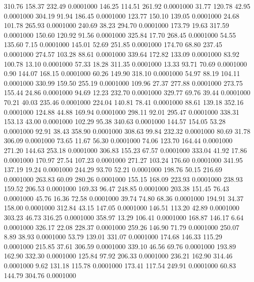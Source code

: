  310.76  158.37  232.49   0.0001000
 146.25  114.51  261.92   0.0001000
  31.77  120.78   42.95   0.0001000
 304.19   91.94  186.45   0.0001000
 123.77  150.10  139.05   0.0001000
  24.68  101.78  265.93   0.0001000
 240.69   38.23  294.70   0.0001000
 173.79   19.63  317.59   0.0001000
 150.60  120.92   91.56   0.0001000
 325.84   17.70  268.45   0.0001000
  54.55  135.60    7.15   0.0001000
 145.01   52.69  251.85   0.0001000
 174.70   68.80  237.45   0.0001000
 274.57  103.28   88.61   0.0001000
 339.64  172.82  133.09   0.0001000
  83.92  100.78   13.10   0.0001000
  57.33   18.28  311.35   0.0001000
  13.33   93.71   70.69   0.0001000
   0.90  144.07  168.15   0.0001000
  60.26  149.90  318.10   0.0001000
  54.97   88.19  104.11   0.0001000
 330.99  159.50  255.19   0.0001000
 109.96   27.37  277.88   0.0001000
 273.75  155.44   24.86   0.0001000
  94.69   12.23  232.70   0.0001000
 329.77   69.76   39.44   0.0001000
  70.21   40.03  235.46   0.0001000
 224.04  140.81   78.41   0.0001000
  88.61  139.18  352.16   0.0001000
 124.88   44.88  169.94   0.0001000
 298.11   92.01  295.47   0.0001000
 338.31  153.13   43.00   0.0001000
 102.29   95.38  340.63   0.0001000
 144.57  154.05   53.28   0.0001000
  92.91   38.43  358.90   0.0001000
 308.63   99.84  232.32   0.0001000
  80.69   31.78  306.09   0.0001000
  73.65   11.67   56.30   0.0001000
  74.06  123.70  164.44   0.0001000
 271.20  144.63  253.18   0.0001000
 306.83  155.23   67.57   0.0001000
 333.04   41.92   17.86   0.0001000
 170.97   27.54  107.23   0.0001000
 271.27  103.24  176.60   0.0001000
 341.95  137.19   19.24   0.0001000
 244.29   93.70   52.21   0.0001000
 198.76   50.15  216.69   0.0001000
 263.83   60.09  280.26   0.0001000
 155.15  168.09  223.93   0.0001000
 238.93  159.52  206.53   0.0001000
 169.33   96.47  248.85   0.0001000
 203.38  151.45   76.43   0.0001000
  45.76   16.36   72.58   0.0001000
  39.74   74.80   68.36   0.0001000
 194.91   34.37  158.00   0.0001000
 312.84   43.15  147.05   0.0001000
 146.51  113.20   42.89   0.0001000
 303.23   46.73  316.25   0.0001000
 358.97   13.29  106.41   0.0001000
 168.87  146.17    6.64   0.0001000
 326.17   22.08  228.37   0.0001000
 259.26  146.90   71.79   0.0001000
 250.07    8.89   38.93   0.0001000
  53.79  139.01  331.07   0.0001000
 174.68  146.33  115.29   0.0001000
 215.85   37.61  306.59   0.0001000
 339.10   46.56   69.76   0.0001000
 193.89  162.90  332.30   0.0001000
 125.84   97.92  206.33   0.0001000
 236.21  162.90  314.46   0.0001000
   9.62  131.18  115.78   0.0001000
 173.41  117.54  249.91   0.0001000
  60.83  144.79  304.76   0.0001000
